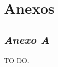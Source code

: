 \chapter[Anexos]{Anexos}
\label{chap:anexos}

	\section[Anexo A]{\emph{Anexo A}}
	\label{sec:anexoA}

		TO DO.